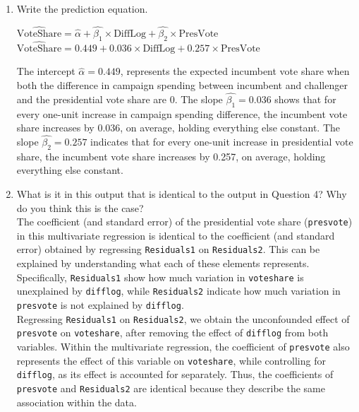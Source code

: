 \documentclass[12pt,letterpaper]{article}
\begin{document}
\begin{enumerate}
		\item Write the prediction equation.	
		\begin{center}
		$\widehat{\text {VoteShare}} = \hat{\alpha} + \hat{\beta_1} \times \text{DiffLog} + \hat{\beta_2} \times \text{PresVote}$ \\[0.2cm]
		$\widehat{\text {VoteShare}} = 0.449 + 0.036 \times \text{DiffLog} + 0.257 \times \text{PresVote}$
		\end{center}
		The intercept $\hat{\alpha} = 0.449$, represents the expected incumbent vote share when both the difference in campaign spending between incumbent and challenger and the presidential vote share are 0. The slope $\hat{\beta_1} = 0.036$ shows that for every one-unit increase in campaign spending difference, the incumbent vote share increases by 0.036, on average, holding everything else constant. The slope $\hat{\beta_2} = 0.257$ indicates that for every one-unit increase in presidential vote share, the incumbent vote share increases by 0.257, on average, holding everything else constant. 
		\newpage
		\item What is it in this output that is identical to the output in Question 4? Why do you think this is the case? \\ [0.5cm]
		The coefficient (and standard error) of the presidential vote share (\texttt{presvote}) in this multivariate regression is identical to the coefficient (and standard error) obtained by regressing \texttt{Residuals1} on \texttt{Residuals2}. This can be explained by understanding what each of these elements represents. Specifically, \texttt{Residuals1} show how much variation in \texttt{voteshare} is unexplained by \texttt{difflog}, while  \texttt{Residuals2} indicate how much variation in \texttt{presvote} is not explained by \texttt{difflog}. \\ [0.2cm]
		Regressing \texttt{Residuals1} on \texttt{Residuals2}, we obtain the unconfounded effect of \texttt{presvote} on \texttt{voteshare}, after removing the effect of \texttt{difflog} from both variables. Within the multivariate regression, the coefficient of \texttt{presvote} also represents the effect of this variable on \texttt{voteshare}, while controlling for \texttt{difflog}, as its effect is accounted for separately. Thus, the coefficients of \texttt{presvote} and \texttt{Residuals2} are identical because they describe the same association within the data. 
	\end{enumerate}
\end{document}

